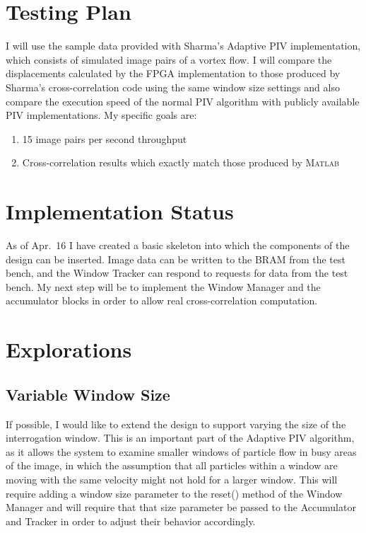 \documentclass{article}
\begin{document}
\section{Testing Plan}
I will use the sample data provided with Sharma's Adaptive PIV implementation, which consists of simulated image pairs of a vortex flow. I will compare the displacements calculated by the FPGA implementation to those produced by Sharma's cross-correlation code using the same window size settings and also compare the execution speed of the normal PIV algorithm with publicly available PIV implementations. My specific goals are:
\begin{enumerate}
	\item 15 image pairs per second throughput
	\item Cross-correlation results which exactly match those produced by \textsc{Matlab}
\end{enumerate}

\section{Implementation Status}
As of Apr.~16 I have created a basic skeleton into which the components of the design can be inserted. Image data can be written to the BRAM from the test bench, and the Window Tracker can respond to requests for data from the test bench. My next step will be to implement the Window Manager and the accumulator blocks in order to allow real cross-correlation computation. 

\section{Explorations}
\subsection{Variable Window Size}
If possible, I would like to extend the design to support varying the size of the interrogation window. This is an important part of the Adaptive PIV algorithm, as it allows the system to examine smaller windows of particle flow in busy areas of the image, in which the assumption that all particles within a window are moving with the same velocity might not hold for a larger window. This will require adding a window size parameter to the reset() method of the Window Manager and will require that that size parameter be passed to the Accumulator and Tracker in order to adjust their behavior accordingly. 
\end{document}
